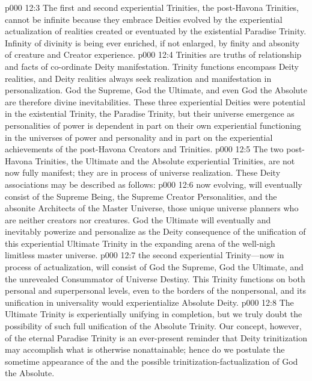 \pc \vs p000 12:3 The first and second experiential Trinities, the post\hyp{}Havona Trinities, cannot be infinite because they embrace  Deities evolved by the experiential actualization of realities created or eventuated by the existential Paradise Trinity. Infinity of divinity is being ever enriched, if not enlarged, by finity and absonity of creature and Creator experience.
\vs p000 12:4 Trinities are truths of relationship and facts of co\hyp{}ordinate Deity manifestation. Trinity functions encompass Deity realities, and Deity realities always seek realization and manifestation in personalization. God the Supreme, God the Ultimate, and even God the Absolute are therefore divine inevitabilities. These three experiential Deities were potential in the existential Trinity, the Paradise Trinity, but their universe emergence as personalities of power is dependent in part on their own experiential functioning in the universes of power and personality and in part on the experiential achievements of the post\hyp{}Havona Creators and Trinities.
\pc \vs p000 12:5 The two post\hyp{}Havona Trinities, the Ultimate and the Absolute experiential Trinities, are not now fully manifest; they are in process of universe realization. These Deity associations may be described as follows:
\pc \vs p000 12:6 \bibnobreakspace {} now evolving, will eventually consist of the Supreme Being, the Supreme Creator Personalities, and the absonite Architects of the Master Universe, those unique universe planners who are neither creators nor creatures. God the Ultimate will eventually and inevitably powerize and personalize as the Deity consequence of the unification of this experiential Ultimate Trinity in the expanding arena of the well\hyp{}nigh limitless master universe.
\vs p000 12:7 \bibnobreakspace {}the second experiential Trinity---now in process of actualization, will consist of God the Supreme, God the Ultimate, and the unrevealed Consummator of Universe Destiny. This Trinity functions on both personal and superpersonal levels, even to the borders of the nonpersonal, and its unification in universality would experientialize Absolute Deity.
\pc \vs p000 12:8 The Ultimate Trinity is experientially unifying in completion, but we truly doubt the possibility of such full unification of the Absolute Trinity. Our concept, however, of the eternal Paradise Trinity is an ever\hyp{}present reminder that Deity trinitization may accomplish what is otherwise nonattainable; hence do we postulate the sometime appearance of the  and the possible trinitization\hyp{}factualization of God the Absolute.

